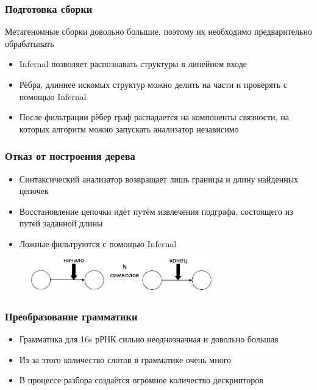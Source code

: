 \documentclass{beamer}
\begin{document}
    \begin{frame}
        \frametitle{Подготовка сборки}
        Метагеномные сборки довольно большие, поэтому их необходимо предварительно обрабатывать
        
        
        \begin{itemize}
            \item Infernal позволяет распознавать структуры в линейном входе
            \item Рёбра, длиннее искомых структур можно делить на части и проверять с помощью Infernal
            \item После фильтрации рёбер граф распадается на компоненты связности, на которых алгоритм можно запускать анализатор независимо
        \end{itemize}
    \end{frame}
    
    \begin{frame}
        \frametitle{Отказ от построения дерева}
        \begin{itemize}
            \item Синтаксический анализатор возвращает лишь границы и длину найденных цепочек
            \item Восстановление цепочки идёт путём извлечения подграфа, состоящего из путей заданной длины
            \item Ложные фильтруются с помощью Infernal
        \end{itemize}
        
        \begin{figure}[b]
            \centering
            \includegraphics[width=8cm]{pictures/noTree.pdf}  
        \end{figure}
    \end{frame}
    
    \begin{frame}
        \frametitle{Преобразование грамматики}
        \begin{itemize}
            \item Грамматика для 16s рРНК сильно неоднозначная и довольно большая 
            \item Из-за этого количество слотов в грамматике очень много
            \item В процессе разбора создаётся огромное количество дескрипторов 
        \end{itemize} 
    \end{frame}
    
\end{document}
